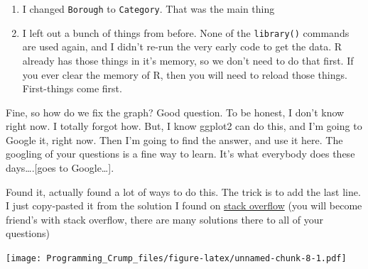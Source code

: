 \documentclass[]{book}
\newenvironment{Shaded}{\begin{snugshade}}{\end{snugshade}}
\newcommand{\KeywordTok}[1]{\textcolor[rgb]{0.13,0.29,0.53}{\textbf{{#1}}}}
\newcommand{\DataTypeTok}[1]{\textcolor[rgb]{0.13,0.29,0.53}{{#1}}}
\newcommand{\DecValTok}[1]{\textcolor[rgb]{0.00,0.00,0.81}{{#1}}}
\newcommand{\StringTok}[1]{\textcolor[rgb]{0.31,0.60,0.02}{{#1}}}
\newcommand{\NormalTok}[1]{{#1}}
\theoremstyle{definition}
\theoremstyle{definition}
\theoremstyle{definition}
\theoremstyle{remark}
\begin{document}
\begin{enumerate}
\def\labelenumi{\arabic{enumi}.}
\item
  I changed \texttt{Borough} to \texttt{Category}. That was the main
  thing
\item
  I left out a bunch of things from before. None of the
  \texttt{library()} commands are used again, and I didn't re-run the
  very early code to get the data. R already has those things in it's
  memory, so we don't need to do that first. If you ever clear the
  memory of R, then you will need to reload those things. First-things
  come first.
\end{enumerate}

Fine, so how do we fix the graph? Good question. To be honest, I don't
know right now. I totally forgot how. But, I know ggplot2 can do this,
and I'm going to Google it, right now. Then I'm going to find the
answer, and use it here. The googling of your questions is a fine way to
learn. It's what everybody does these days\ldots{}.{[}goes to
Google\ldots{}{]}.

Found it, actually found a lot of ways to do this. The trick is to add
the last line. I just copy-pasted it from the solution I found on
\href{https://stackoverflow.com/questions/1330989/rotating-and-spacing-axis-labels-in-ggplot2}{stack
overflow} (you will become friend's with stack overflow, there are many
solutions there to all of your questions)

\begin{Shaded}
\end{Shaded}

\texttt{[image: Programming\_Crump\_files/figure-latex/unnamed-chunk-8-1.pdf]}
\end{document}
